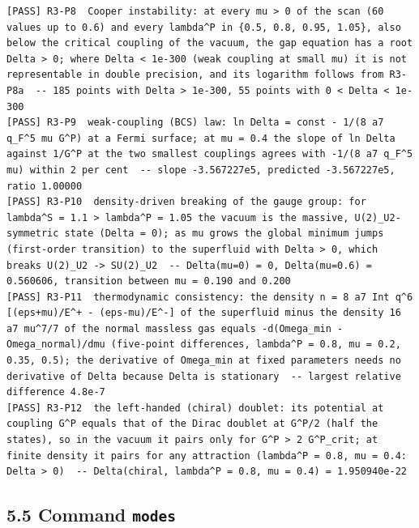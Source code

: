 \documentclass[
  10pt,
]{article}
\begin{document}
\begin{verbatim}
[PASS] R3-P8  Cooper instability: at every mu > 0 of the scan (60 values up to 0.6) and every lambda^P in {0.5, 0.8, 0.95, 1.05}, also below the critical coupling of the vacuum, the gap equation has a root Delta > 0; where Delta < 1e-300 (weak coupling at small mu) it is not representable in double precision, and its logarithm follows from R3-P8a  -- 185 points with Delta > 1e-300, 55 points with 0 < Delta < 1e-300
[PASS] R3-P9  weak-coupling (BCS) law: ln Delta = const - 1/(8 a7 q_F^5 mu G^P) at a Fermi surface; at mu = 0.4 the slope of ln Delta against 1/G^P at the two smallest couplings agrees with -1/(8 a7 q_F^5 mu) within 2 per cent  -- slope -3.567227e5, predicted -3.567227e5, ratio 1.00000
[PASS] R3-P10  density-driven breaking of the gauge group: for lambda^S = 1.1 > lambda^P = 1.05 the vacuum is the massive, U(2)_U2-symmetric state (Delta = 0); as mu grows the global minimum jumps (first-order transition) to the superfluid with Delta > 0, which breaks U(2)_U2 -> SU(2)_U2  -- Delta(mu=0) = 0, Delta(mu=0.6) = 0.560606, transition between mu = 0.190 and 0.200
[PASS] R3-P11  thermodynamic consistency: the density n = 8 a7 Int q^6 [(eps+mu)/E^+ - (eps-mu)/E^-] of the superfluid minus the density 16 a7 mu^7/7 of the normal massless gas equals -d(Omega_min - Omega_normal)/dmu (five-point differences, lambda^P = 0.8, mu = 0.2, 0.35, 0.5); the derivative of Omega_min at fixed parameters needs no derivative of Delta because Delta is stationary  -- largest relative difference 4.8e-7
[PASS] R3-P12  the left-handed (chiral) doublet: its potential at coupling G^P equals that of the Dirac doublet at G^P/2 (half the states), so in the vacuum it pairs only for G^P > 2 G^P_crit; at finite density it pairs for any attraction (lambda^P = 0.8, mu = 0.4: Delta > 0)  -- Delta(chiral, lambda^P = 0.8, mu = 0.4) = 1.950940e-22
\end{verbatim}

\hypertarget{command-modes}{%
\subsection{\texorpdfstring{5.5 Command
\texttt{modes}}{5.5 Command modes}}\label{command-modes}}
\end{document}

